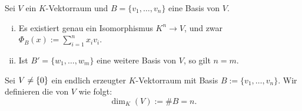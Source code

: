 \begin{korollar}
	\label{kor:I.8.16}
	Sei $V$ ein $K$-Vektorraum und $B = \{v_1,\dots,v_n\}$ eine Basis von $V$.
	\begin{enumerate}[(i)]
		\item	Es existiert genau ein Isomorphismus $K^n \rightarrow V$, und zwar $\Phi_B(x) := \sum_{i=1}^{n} x_iv_i$.
		\item Ist $B' = \{w_1,\dots,w_m\}$ eine weitere Basis von $V$, so gilt $n = m$.
	\end{enumerate}
\end{korollar}

\begin{definition}[Dimension]
	\label{def:I.8.17}
	Sei $V \neq \{0\}$ ein endlich erzeugter $K$-Vektorraum mit Basis $B := \{v_1,\dots,v_n\}$. 
	Wir definieren die  von $V$ wie folgt:
	\[
		\dim_K(V) := \#B = n.
	\]
\end{definition}
\cleardoubleoddemptypage